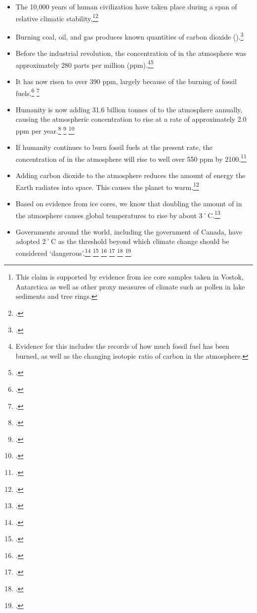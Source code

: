 \documentclass[10pt]{article}
\begin{document}
\begin{itemize}
	\item The 10,000 years of human civilization have taken place during a span of relative climatic stability.\footnote{This claim is supported by evidence from ice core samples taken in Vostok, Antarctica as well as other proxy measures of climate such as pollen in lake sediments and tree rings.}\footcite[][p. 4]{Alley2000}
	\item Burning coal, oil, and gas produces known quantities of carbon dioxide ().\footcite[For example, the U.S. Environmental Protection Agency (EPA) lists quantities of  produced by burning a barrel of oil, metric tonne of coal, or therm (100,000 British thermal units) of natural gas:][]{CalculationsReferences}
	\item Before the industrial revolution, the concentration of  in the atmosphere was approximately 280 parts per million (ppm).\footnote{Evidence for this includes the records of how much fossil fuel has been burned, as well as the changing isotopic ratio of carbon in the atmosphere.}\footcite[][]{IPCC4ARdrivers}
	\item It has now risen to over 390 ppm, largely because of the burning of fossil fuels.\footcite[][]{KeelingExplanation} \footcite[][p. xiv]{WorldBank4C}
	\item Humanity is now adding 31.6 billion tonnes of  to the atmosphere annually, causing the atmospheric concentration to rise at a rate of approximately 2.0 ppm per year.\footcite[][]{RedrawingClimateEnergy} \footcite[][]{NOAATrends} \footcite[See also: ][]{FaustianGrowth}
	\item If humanity continues to burn fossil fuels at the present rate, the concentration of  in the atmosphere will rise to well over 550 ppm by 2100.\footcite[][]{IPCCCO2proj}
	\item Adding carbon dioxide to the atmosphere reduces the amount of energy the Earth radiates into space. This causes the planet to warm.\footcite[][]{IPCC4ARdrivers}
	\item Based on evidence from ice cores, we know that doubling the amount of  in the atmosphere causes global temperatures to rise by about 3˚C.\footcite[][p. 473]{SafeOperatingSpace}
	\item Governments around the world, including the government of Canada, have adopted 2˚C as the threshold beyond which climate change should be considered `dangerous'.\footcite{CopenhagenAccord} \footcite[][p. 5]{CriticalDecade2013} \footcite[See also: ][p. 473]{SafeOperatingSpace} \footcite[See also: ][]{EmGapReport} \footcite[][p. 151]{ClarkeDomaradzki2011} \footcite[][]{Anderson2011}

\end{itemize}
\end{document}

